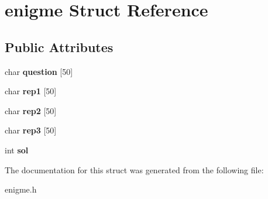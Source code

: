\hypertarget{structenigme}{}\section{enigme Struct Reference}
\label{structenigme}
\subsection*{Public Attributes}
\begin{DoxyCompactItemize}
\item 
char {\bfseries question} \mbox{[}50\mbox{]}\hypertarget{structenigme_ace9f0a329784d50fbea8d84a9590ca94}{}\label{structenigme_ace9f0a329784d50fbea8d84a9590ca94}

\item 
char {\bfseries rep1} \mbox{[}50\mbox{]}\hypertarget{structenigme_abbf793dd786fc6749edbebe13eb8cc93}{}\label{structenigme_abbf793dd786fc6749edbebe13eb8cc93}

\item 
char {\bfseries rep2} \mbox{[}50\mbox{]}\hypertarget{structenigme_a546951153ffaaff07718c449b8672b7d}{}\label{structenigme_a546951153ffaaff07718c449b8672b7d}

\item 
char {\bfseries rep3} \mbox{[}50\mbox{]}\hypertarget{structenigme_ae2d738348d1092367080ba306562c0f8}{}\label{structenigme_ae2d738348d1092367080ba306562c0f8}

\item 
int {\bfseries sol}\hypertarget{structenigme_aeeb9f32dbe00faa415d55deb3038c08f}{}\label{structenigme_aeeb9f32dbe00faa415d55deb3038c08f}

\end{DoxyCompactItemize}


The documentation for this struct was generated from the following file\+:\begin{DoxyCompactItemize}
\item 
enigme.\+h\end{DoxyCompactItemize}
